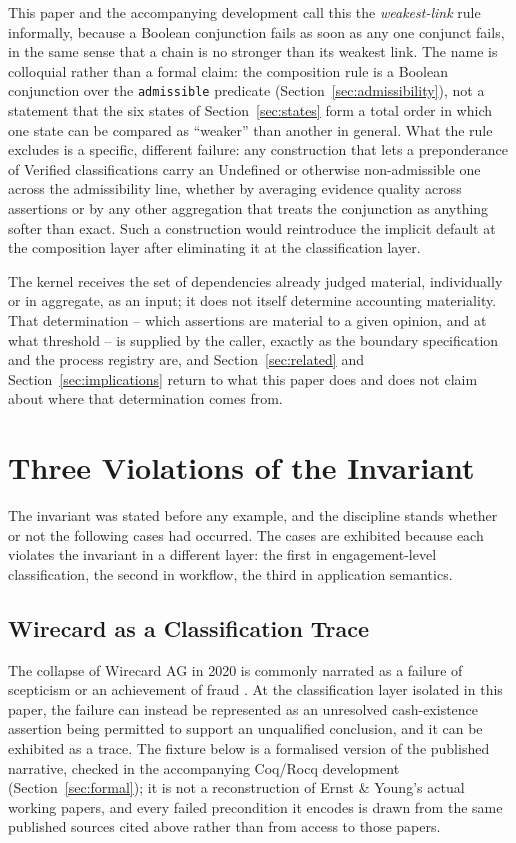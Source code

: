 \documentclass[smallcondensed,envcountsect,natbib]{svjour3}
\newcommand{\state}[1]{\textsf{#1}}
\begin{document}
This paper and the accompanying development call this the \emph{weakest-link} rule informally, because a Boolean conjunction fails as soon as any one conjunct fails, in the same sense that a chain is no stronger than its weakest link. The name is colloquial rather than a formal claim: the composition rule is a Boolean conjunction over the \texttt{admissible} predicate (Section~\ref{sec:admissibility}), not a statement that the six states of Section~\ref{sec:states} form a total order in which one state can be compared as ``weaker'' than another in general. What the rule excludes is a specific, different failure: any construction that lets a preponderance of \state{Verified} classifications carry an \state{Undefined} or otherwise non-admissible one across the admissibility line, whether by averaging evidence quality across assertions or by any other aggregation that treats the conjunction as anything softer than exact. Such a construction would reintroduce the implicit default at the composition layer after eliminating it at the classification layer.

The kernel receives the set of dependencies already judged material, individually or in aggregate, as an input; it does not itself determine accounting materiality. That determination -- which assertions are material to a given opinion, and at what threshold -- is supplied by the caller, exactly as the boundary specification and the process registry are, and Section~\ref{sec:related} and Section~\ref{sec:implications} return to what this paper does and does not claim about where that determination comes from.

\section{Three Violations of the Invariant}
\label{sec:examples}

The invariant was stated before any example, and the discipline stands whether or not the following cases had occurred. The cases are exhibited because each violates the invariant in a different layer: the first in engagement-level classification, the second in workflow, the third in application semantics.

\subsection{Wirecard as a Classification Trace}
\label{sec:wirecard}

The collapse of Wirecard AG in 2020 is commonly narrated as a failure of scepticism or an achievement of fraud \citep{mccrum2022, esma2020}. At the classification layer isolated in this paper, the failure can instead be represented as an unresolved cash-existence assertion being permitted to support an unqualified conclusion, and it can be exhibited as a trace. The fixture below is a formalised version of the published narrative, checked in the accompanying Coq/Rocq development (Section~\ref{sec:formal}); it is not a reconstruction of Ernst \& Young's actual working papers, and every failed precondition it encodes is drawn from the same published sources cited above rather than from access to those papers.
\end{document}
